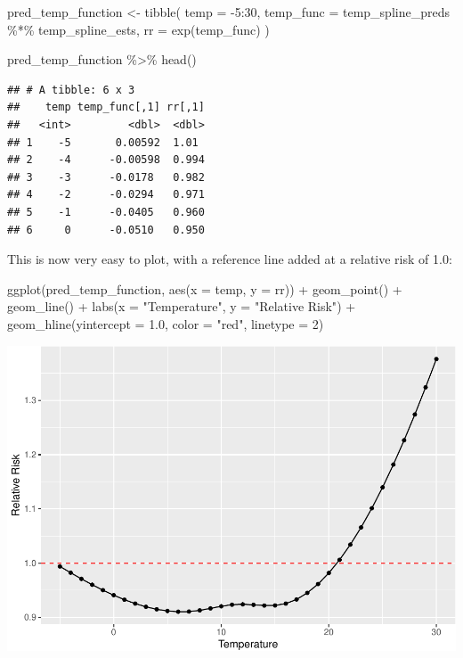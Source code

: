 \documentclass[
]{book}
\newenvironment{Shaded}{\begin{snugshade}}{\end{snugshade}}
\newcommand{\AttributeTok}[1]{\textcolor[rgb]{0.77,0.63,0.00}{#1}}
\newcommand{\DecValTok}[1]{\textcolor[rgb]{0.00,0.00,0.81}{#1}}
\newcommand{\FloatTok}[1]{\textcolor[rgb]{0.00,0.00,0.81}{#1}}
\newcommand{\FunctionTok}[1]{\textcolor[rgb]{0.00,0.00,0.00}{#1}}
\newcommand{\NormalTok}[1]{#1}
\newcommand{\OtherTok}[1]{\textcolor[rgb]{0.56,0.35,0.01}{#1}}
\newcommand{\SpecialCharTok}[1]{\textcolor[rgb]{0.00,0.00,0.00}{#1}}
\newcommand{\StringTok}[1]{\textcolor[rgb]{0.31,0.60,0.02}{#1}}
\begin{document}
\begin{Shaded}
\begin{Highlighting}[]
\NormalTok{pred\_temp\_function }\OtherTok{\textless{}{-}} \FunctionTok{tibble}\NormalTok{(}
  \AttributeTok{temp =} \SpecialCharTok{{-}}\DecValTok{5}\SpecialCharTok{:}\DecValTok{30}\NormalTok{, }
  \AttributeTok{temp\_func =}\NormalTok{ temp\_spline\_preds }\SpecialCharTok{\%*\%}\NormalTok{ temp\_spline\_ests,}
  \AttributeTok{rr =} \FunctionTok{exp}\NormalTok{(temp\_func)}
\NormalTok{)}

\NormalTok{pred\_temp\_function }\SpecialCharTok{\%\textgreater{}\%} 
  \FunctionTok{head}\NormalTok{()}
\end{Highlighting}
\end{Shaded}

\begin{verbatim}
## # A tibble: 6 x 3
##    temp temp_func[,1] rr[,1]
##   <int>         <dbl>  <dbl>
## 1    -5       0.00592  1.01 
## 2    -4      -0.00598  0.994
## 3    -3      -0.0178   0.982
## 4    -2      -0.0294   0.971
## 5    -1      -0.0405   0.960
## 6     0      -0.0510   0.950
\end{verbatim}

This is now very easy to plot, with a reference line added at a relative risk of 1.0:

\begin{Shaded}
\begin{Highlighting}[]
\FunctionTok{ggplot}\NormalTok{(pred\_temp\_function, }\FunctionTok{aes}\NormalTok{(}\AttributeTok{x =}\NormalTok{ temp, }\AttributeTok{y =}\NormalTok{ rr)) }\SpecialCharTok{+} 
  \FunctionTok{geom\_point}\NormalTok{() }\SpecialCharTok{+} 
  \FunctionTok{geom\_line}\NormalTok{() }\SpecialCharTok{+} 
  \FunctionTok{labs}\NormalTok{(}\AttributeTok{x =} \StringTok{"Temperature"}\NormalTok{, }
       \AttributeTok{y =} \StringTok{"Relative Risk"}\NormalTok{) }\SpecialCharTok{+} 
  \FunctionTok{geom\_hline}\NormalTok{(}\AttributeTok{yintercept =} \FloatTok{1.0}\NormalTok{, }\AttributeTok{color =} \StringTok{"red"}\NormalTok{, }\AttributeTok{linetype =} \DecValTok{2}\NormalTok{)}
\end{Highlighting}
\end{Shaded}

\includegraphics{adv_epi_analysis_files/figure-latex/unnamed-chunk-73-1.pdf}
\end{document}
